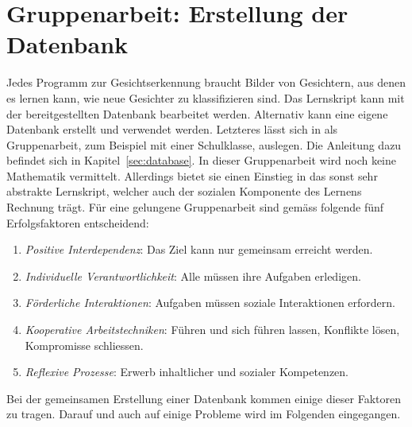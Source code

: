 \section{Gruppenarbeit: Erstellung der Datenbank}
Jedes Programm zur Gesichtserkennung braucht Bilder von Gesichtern, aus denen es \glqq{}lernen\grqq{} kann, wie neue Gesichter zu klassifizieren sind.
Das Lernskript kann mit der bereitgestellten Datenbank bearbeitet werden.
Alternativ kann eine eigene Datenbank erstellt und verwendet werden.
Letzteres lässt sich in als Gruppenarbeit, zum Beispiel mit einer Schulklasse, auslegen.
Die Anleitung dazu befindet sich in Kapitel~\ref{sec:database}.
In dieser Gruppenarbeit wird noch keine Mathematik vermittelt.
Allerdings bietet sie einen Einstieg in das sonst sehr abstrakte Lernskript, welcher auch der sozialen Komponente des Lernens Rechnung trägt.
Für eine gelungene Gruppenarbeit sind gemäss \cite{Bosch2019} folgende fünf Erfolgsfaktoren entscheidend:
\begin{enumerate}[label=\arabic*.]
	\item \textit{Positive Interdependenz}: Das Ziel kann nur gemeinsam erreicht werden.
	\item \textit{Individuelle Verantwortlichkeit}: Alle müssen ihre Aufgaben
erledigen.
	\item \textit{Förderliche Interaktionen}: Aufgaben müssen soziale Interaktionen erfordern.
	\item \textit{Kooperative Arbeitstechniken}: Führen und sich führen lassen, Konflikte lösen, Kompromisse schliessen.
	\item \textit{Reflexive Prozesse}: Erwerb inhaltlicher und sozialer Kompetenzen.
\end{enumerate}
Bei der gemeinsamen Erstellung einer Datenbank kommen einige dieser Faktoren zu tragen.
Darauf und auch auf einige Probleme wird im Folgenden eingegangen.
